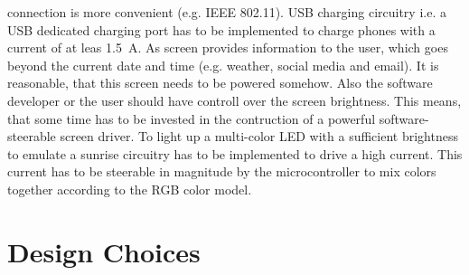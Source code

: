connection is more convenient (e.g. IEEE 802.11).  \newpar USB charging
circuitry i.e. a USB dedicated charging port has to be implemented to charge
phones with a current of at leas \SI{1.5}{A}.  \newpar As screen provides
information to the user, which goes beyond the current date and time (e.g.
weather, social media and email). It is reasonable, that this screen needs to be
powered somehow. Also the software developer or the user should have controll
over the screen brightness.  This means, that some time has to be invested in
the contruction of a powerful software-steerable screen driver.  \newpar To
light up a multi-color LED with a sufficient brightness to emulate a sunrise
circuitry has to be implemented to drive a high current. This current has to be
steerable in magnitude by the microcontroller to mix colors together according
to the RGB color model. 

\section{Design Choices}

